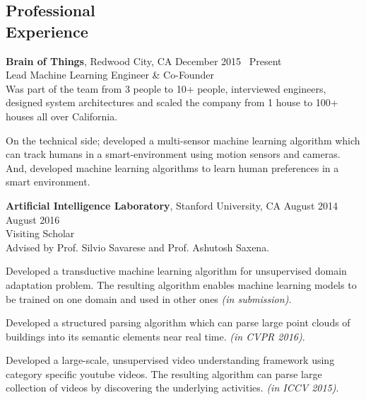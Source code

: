 \documentclass[margin,line,10pt]{resume}
\begin{document}
\begin{resume}
    \section{\mysidestyle \textcolor{olgray}{Professional\\Experience}}
    
    \textbf{Brain of Things}, Redwood City, CA \hfill December 2015 \textendash ~Present\vspace{0mm}\\\vspace{0mm}
    \hspace{-1.5mm} Lead Machine Learning Engineer \& Co-Founder  \hfill \vspace{-5mm} \\

Was part of the team from 3 people to 10+ people, interviewed engineers, designed system architectures and scaled the company from 1 house to 100+ houses all over California. 

On the technical side; developed a multi-sensor machine learning algorithm which can track humans in a smart-environment using motion sensors and cameras. And, developed machine learning algorithms to learn human preferences in a smart environment.


    \textbf{Artificial Intelligence Laboratory}, Stanford University, CA \hfill August 2014 \textendash ~ August 2016 \vspace{0mm}\\\vspace{0mm}
  \hspace{-1mm}Visiting Scholar  \hfill \vspace{1.5mm} \\
  Advised by Prof. Silvio Savarese and Prof. Ashutosh Saxena.

Developed a transductive machine learning algorithm for unsupervised domain adaptation problem. The resulting algorithm enables machine learning models to be trained on one domain and used in other ones \emph{(in submission)}.

\newpage
  Developed a structured parsing algorithm which can parse large point clouds of buildings into its semantic elements near real time. \emph{(in CVPR 2016)}.

  Developed a large-scale, unsupervised video understanding framework using category specific youtube videos. The resulting algorithm can parse large collection of videos by discovering the underlying activities. \emph{(in ICCV 2015)}.


\end{resume}
\end{document}
